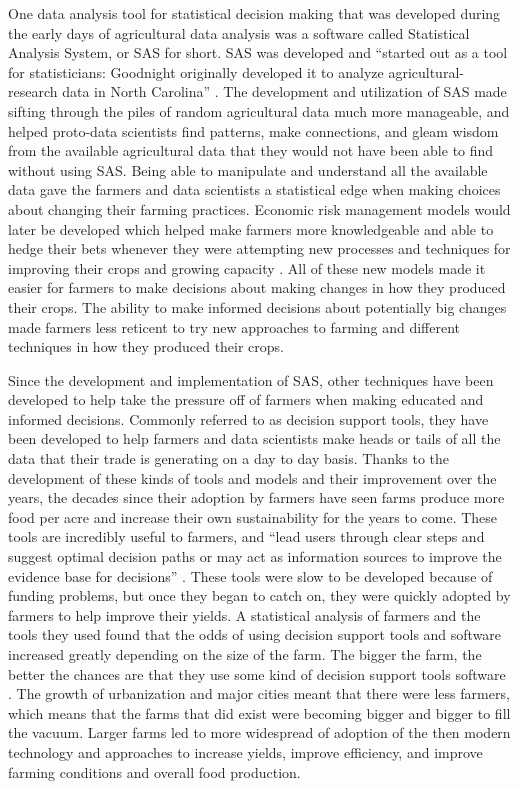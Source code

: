 \documentclass[sigconf]{acmart}
\begin{document}
One data analysis tool for statistical decision making that was developed during the early days of agricultural data analysis was a software called Statistical Analysis System, or SAS for short. SAS was developed and ``started out as a tool for statisticians: Goodnight originally developed it to analyze agricultural-research data in North Carolina'' \cite{jones2017}. The development and utilization of SAS made sifting through the piles of random agricultural data much more manageable, and helped proto-data scientists find patterns, make connections, and gleam wisdom from the available agricultural data that they would not have been able to find without using SAS. Being able to manipulate and understand all the available data gave the farmers and data scientists a statistical edge when making choices about changing their farming practices. Economic risk management models would later be developed which helped make farmers more knowledgeable and able to hedge their bets whenever they were attempting new processes and techniques for improving their crops and growing capacity \cite{rose2016}. All of these new models made it easier for farmers to make decisions about making changes in how they produced their crops. The ability to make informed decisions about potentially big changes made farmers less reticent to try new approaches to farming and different techniques in how they produced their crops.

Since the development and implementation of SAS, other techniques have been developed to help take the pressure off of farmers when making educated and informed decisions. Commonly referred to as decision support tools, they have been developed to help farmers and data scientists make heads or tails of all the data that their trade is generating on a day to day basis. Thanks to the development of these kinds of tools and models and their improvement over the years, the decades since their adoption by farmers have seen farms produce more food per acre and increase their own sustainability for the years to come. These tools are incredibly useful to farmers, and ``lead users through clear steps and suggest optimal decision paths or may act as information sources to improve the evidence base for decisions'' \cite{rose2016}. These tools were slow to be developed because of funding problems, but once they began to catch on, they were quickly adopted by farmers to help improve their yields. A statistical analysis of farmers and the tools they used found that the odds of using decision support tools and software increased greatly depending on the size of the farm. The bigger the farm, the better the chances are that they use some kind of decision support tools software \cite{rose2016}. The growth of urbanization and major cities meant that there were less farmers, which means that the farms that did exist were becoming bigger and bigger to fill the vacuum. Larger farms led to more widespread of adoption of the then modern technology and approaches to increase yields, improve efficiency, and improve farming conditions and overall food production.
\end{document}
